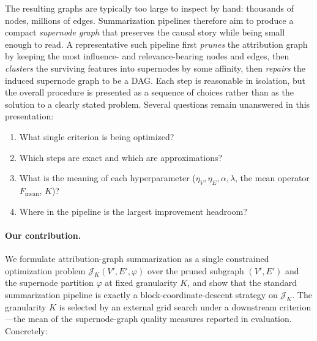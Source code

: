 \documentclass[table, 11pt]{article}
\begin{document}
The resulting graphs are typically too large to inspect by hand:
thousands of nodes, millions of edges. Summarization pipelines
therefore aim to produce a compact \emph{supernode graph} that
preserves the causal story while being small enough to read. A
representative such pipeline first \emph{prunes} the attribution
graph by keeping the most influence- and relevance-bearing nodes and
edges, then \emph{clusters} the surviving features into supernodes by
some affinity, then \emph{repairs} the induced supernode graph to be
a DAG. Each step is reasonable in isolation, but the overall
procedure is presented as a sequence of choices rather than as the
solution to a clearly stated problem. Several questions remain
unanswered in this presentation:

\begin{enumerate}[leftmargin=*,topsep=2pt,itemsep=2pt]
\item What single criterion is being optimized?
\item Which steps are exact and which are approximations?
\item What is the meaning of each hyperparameter
($\eta_V, \eta_E, \alpha, \lambda$, the mean operator $F_{\text{mean}}$,
$K$)?
\item Where in the pipeline is the largest improvement headroom?
\end{enumerate}

\paragraph{Our contribution.} We formulate attribution-graph
summarization as a single constrained optimization problem
$\mathcal{J}_K(V', E', \varphi)$ over the pruned subgraph $(V', E')$
and the supernode partition $\varphi$ at fixed granularity $K$, and
show that the standard summarization pipeline is exactly a
block-coordinate-descent strategy on $\mathcal{J}_K$.
The granularity $K$ is selected by an external grid search under a
downstream criterion---the mean of the supernode-graph quality
measures reported in evaluation. Concretely:
\end{document}
